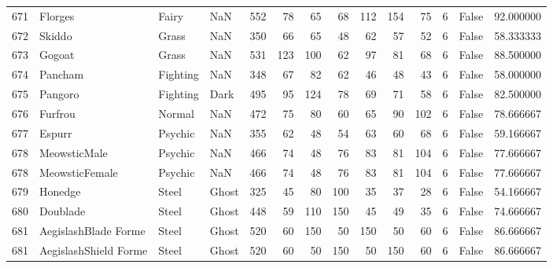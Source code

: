 \begin{tabular}{rlllrrrrrrrrlr}
 671 &                    Florges &     Fairy &       NaN &    552 &   78 &      65 &       68 &      112 &      154 &     75 &           6 &      False &   92.000000 \\
 672 &                     Skiddo &     Grass &       NaN &    350 &   66 &      65 &       48 &       62 &       57 &     52 &           6 &      False &   58.333333 \\
 673 &                     Gogoat &     Grass &       NaN &    531 &  123 &     100 &       62 &       97 &       81 &     68 &           6 &      False &   88.500000 \\
 674 &                    Pancham &  Fighting &       NaN &    348 &   67 &      82 &       62 &       46 &       48 &     43 &           6 &      False &   58.000000 \\
 675 &                    Pangoro &  Fighting &      Dark &    495 &   95 &     124 &       78 &       69 &       71 &     58 &           6 &      False &   82.500000 \\
 676 &                    Furfrou &    Normal &       NaN &    472 &   75 &      80 &       60 &       65 &       90 &    102 &           6 &      False &   78.666667 \\
 677 &                     Espurr &   Psychic &       NaN &    355 &   62 &      48 &       54 &       63 &       60 &     68 &           6 &      False &   59.166667 \\
 678 &               MeowsticMale &   Psychic &       NaN &    466 &   74 &      48 &       76 &       83 &       81 &    104 &           6 &      False &   77.666667 \\
 678 &             MeowsticFemale &   Psychic &       NaN &    466 &   74 &      48 &       76 &       83 &       81 &    104 &           6 &      False &   77.666667 \\
 679 &                    Honedge &     Steel &     Ghost &    325 &   45 &      80 &      100 &       35 &       37 &     28 &           6 &      False &   54.166667 \\
 680 &                   Doublade &     Steel &     Ghost &    448 &   59 &     110 &      150 &       45 &       49 &     35 &           6 &      False &   74.666667 \\
 681 &       AegislashBlade Forme &     Steel &     Ghost &    520 &   60 &     150 &       50 &      150 &       50 &     60 &           6 &      False &   86.666667 \\
 681 &      AegislashShield Forme &     Steel &     Ghost &    520 &   60 &      50 &      150 &       50 &      150 &     60 &           6 &      False &   86.666667 \\

\end{tabular}
